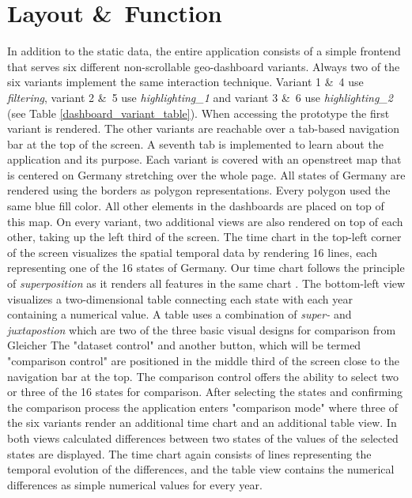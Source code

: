 \section{Layout \&\ Function}
In addition to the static data, the entire application consists of a simple frontend that serves six different non-scrollable
geo-dashboard variants. Always two of the six variants implement the same interaction technique. Variant 1 \&\ 4 use
\textit{filtering}, variant 2 \&\ 5 use \textit{highlighting\_1} and variant 3 \&\ 6 use \textit{highlighting\_2}
(see Table \ref{dashboard_variant_table}). When accessing the prototype the first variant is rendered. The other variants are
reachable over a tab-based navigation bar at the top of the screen. A seventh tab is implemented to learn about the application
and its purpose. Each variant is covered with an openstreet map that is centered on Germany stretching over the whole page. All
states of Germany are rendered using the borders as polygon representations. Every polygon used the same
blue fill color. All other elements in the dashboards are placed on top of this map. On every variant, two additional views
are also rendered on top of each other, taking up the left third of the screen. The time chart in the top-left corner of the
screen visualizes the spatial temporal data by rendering 16 lines, each representing one of the 16 states of Germany. Our time chart
follows the principle of \textit{superposition} as it renders all features in the same chart \citep*{Gleicher.2018}. The
bottom-left view visualizes a two-dimensional table connecting each state with each year containing a numerical value.
A table uses a combination of \textit{super-} and \textit{juxtapostion} which are two of the three basic visual designs for comparison
from Gleicher \citep*{Gleicher.2018} The "dataset control" and another button, which will be termed "comparison control" are positioned
in the middle third of the screen close to the navigation bar at the top. The comparison control offers the ability to select two or three of the 16
states for comparison. After selecting the states and confirming the comparison process the application enters "comparison mode" 
where three of the six variants render an additional time chart and an additional table view. In both views calculated differences
between two states of the values of the selected states are displayed. The time chart again consists of lines representing the temporal
evolution of the differences, and the table view contains the numerical differences as simple numerical values for every year.
